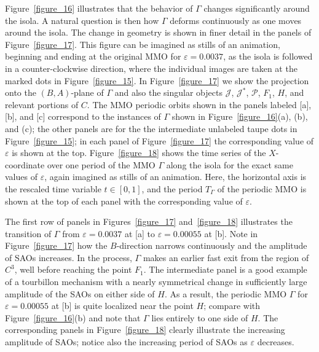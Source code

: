 \documentclass{ws-ijbc}
\begin{document}
Figure~\ref{figure_16} illustrates that the behavior of $\Gamma$ changes significantly around the isola.  A natural question is then how $\Gamma$ deforms continuously as one moves around the isola.  The change in geometry is shown in finer detail in the panels of Figure~\ref{figure_17}. This figure can be imagined as stills of an animation, beginning and ending at the original MMO for $\varepsilon=0.0037$, as the isola is followed in a counter-clockwise direction, where the individual images are taken at the marked dots in Figure~\ref{figure_15}. In Figure~\ref{figure_17} we show the projection onto the $(B,A)$-plane of $\Gamma$ and also the singular objects $\mathscr{J}$, $\mathscr{J}^*$, $\mathscr{P}$, $F_1$, $H$, and relevant portions of $C$.  The MMO periodic orbits shown in the panels labeled [a], [b], and [c] correspond to the instances of $\Gamma$ shown in Figure~\ref{figure_16}(a), (b), and (c); the other panels are for the the intermediate unlabeled taupe dots in Figure~\ref{figure_15}; in each panel of Figure~\ref{figure_17} the corresponding value of $\varepsilon$ is shown at the top. Figure~\ref{figure_18} shows the time series of the $X$-coordinate over one period of the MMO $\Gamma$ along the isola for the exact same values of $\varepsilon$, again imagined as stills of an animation.  Here, the horizontal axis is the rescaled time variable $t \in [0,1]$, and the period $T_\Gamma$ of the periodic MMO is shown at the top of each panel with the corresponding value of $\varepsilon$.

The first row of panels in Figures~\ref{figure_17} and~\ref{figure_18} illustrates the transition of $\Gamma$ from $\varepsilon=0.0037$ at [a] to $\varepsilon=0.00055$ at [b].  Note in Figure~\ref{figure_17} how the $B$-direction narrows continuously and the amplitude of SAOs increases.  In the process, $\Gamma$ makes an earlier fast exit from the region of $C^3$, well before reaching the point $F_1$.  The intermediate panel is a good example of a tourbillon mechanism with a nearly symmetrical change in sufficiently large amplitude of the SAOs on either side of $H$.  As a result, the periodic MMO $\Gamma$ for $\varepsilon=0.00055$ at [b] is quite localized near the point $H$; compare with Figure~\ref{figure_16}(b) and note that $\Gamma$ lies entirely to one side of $H$.  The corresponding panels in Figure~\ref{figure_18} clearly illustrate the increasing amplitude of SAOs; notice also the increasing period of SAOs as $\varepsilon$ decreases.
\end{document}
